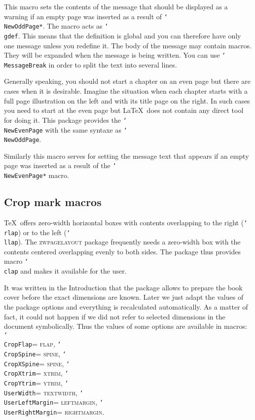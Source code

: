 \documentclass[11pt]{article}
\def\mg#1{\ifvmode\leavevmode\fi\marginpar{\texttt{#1}}\ignorespaces}
\def\cmg#1{\mg{\char`\\#1}}
\def\opt#1{\texorpdfstring{\textmd{\textsc{#1}}}{#1}}
\let\pkg\textsc
\DeclareRobustCommand\cmd[1]{\texttt{\char`\\#1}}
\def\is{\unskip\nobreak\space =\penalty200 \space\ignorespaces}
\begin{document}
\cmg{SetOddPageMessage}
This macro sets the contents of the message that should be displayed as a warning if an empty page
was inserted as a result of \cmd{NewOddPage*}. The macro acts as \cmd{gdef}. This means that the
definition is global and you can therefore have only one message unless you redefine it. The body
of the message may contain macros. They will be expanded when the message is being written. You can
use \cmd{MessageBreak} in order to split the text into several lines.

\cmg{NewEvenPage}
Generally speaking, you should not start a chapter on an even page but there are cases when it is
desirable. Imagine the situation when each chapter starts with a full page illustration on the left
and with its title page on the right. In such cases you need to start at the even page but \LaTeX\
does not contain any direct tool for doing it. This package provides the \cmd{NewEvenPage} with the
same syntaxe as \cmd{NewOddPage}.

\cmg{SetEvenPageMessage}
Similarly this macro serves for setting the message text that appears if an empty page was inserted
as a result of the \cmd{NewEvenPage*} macro.

\subsection{Crop mark macros}\label{crop.macros}
\cmg{clap}
\TeX\ offers zero-width horizontal boxes with contents overlapping to the right (\cmd{rlap}) or to
the left (\cmd{llap}). The \pkg{zwpagelayout} package frequently needs a zero-width box with the
contents centered overlapping evenly to both sides. The package thus provides macro \cmd{clap} and
makes it available for the user.

\cmg{CropFlap}
\cmg{CropSpine}
\cmg{CropXSpine}
\cmg{CropXtrim}
\cmg{CropYtrim}
\cmg{UserWidth}
\cmg{UserLeftMargin}
\cmg{UserRightMargin}
It was written in the Introduction that the package allows to prepare the book cover before the
exact dimensions are known. Later we just adapt the values of the package options and everything is
recalculated automatically. As a matter of fact, it could not happen if we did not refer to
selected dimensions in the document symbolically. Thus the values of some options are available in
macros: \cmd{CropFlap}\is\opt{flap}, \cmd{CropSpine}\is\opt{spine}, \cmd{CropXSpine}\is\opt{spine},
\cmd{CropXtrim}\is\opt{xtrim}, \cmd{CropYtrim}\is\opt{ytrim},
\cmd{UserWidth}\is\opt{textwidth}, \cmd{UserLeftMargin}\is\opt{leftmargin},
\cmd{UserRightMargin}\is\opt{rightmargin}.
\end{document}
